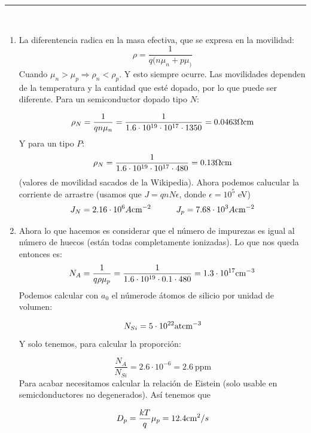 \rule{\textwidth}{0.1pt} \\[2pt]

\begin{enumerate}[label=\alph*)]
	\item La diferentencia radica en la masa efectiva, que se expresa en la movilidad:
		  \begin{equation}
			  \rho = \frac{1}{q(n\mu_n + p \mu_)}
		  \end{equation}
		  Cuando $\mu_n>\mu_p \Rightarrow \rho_n < \rho_p$. Y esto siempre ocurre. Las movilidades dependen de la temperatura y la cantidad que esté dopado, por lo que puede ser diferente. Para un semiconductor dopado tipo $N$:

		  \begin{equation}
			  \rho_N = \frac{1}{qn{\mu_n}} = \frac{1}{1.6\cdot 10^{19} \cdot 10^{17}\cdot 1350}= 0.0463 \Omega \text{cm}
		  \end{equation}
		  Y para un tipo $P$:
		  \begin{equation}
			  \rho_N = \frac{1}{1.6\cdot 10^{19} \cdot 10^{17}\cdot 480} = 0.13 \Omega \text{cm}
		  \end{equation}
		  (valores de movilidad sacados de la Wikipedia). Ahora podemos calucular la corriente de arrastre (usamos que $J=qnN\epsilon$, donde $\epsilon = 10^5$ eV)
		  \begin{equation}
			  J_N =  2.16 \cdot 10^6  A\text{cm}^{-2}  \quad \quad \quad J_p = 7.68 \cdot 10^3  A\text{cm}^{-2}
		  \end{equation}
	\item Ahora lo que hacemos es considerar que el número de impurezas es igual al número de huecos (están todas completamente ionizadas). Lo que nos queda entonces es:
		  \begin{equation}
			  N_A = \frac{1}{q\rho \mu_p } = \frac{1}{1.6\cdot 10^{19} \cdot 0.1 \cdot 480} = 1.3 \cdot 10^{17} \text{cm}^{-3}
		  \end{equation}
		  Podemos calcular con $a_0$ el númerode átomos de silicio por unidad de volumen:

		  \begin{equation}
			  N_{Si} = 5 \cdot 10^{22} \text{at} \text{cm}^{-3}
		  \end{equation}
		  Y solo tenemos, para calcular la proporción:

		  \begin{equation}
			  \frac{N_A}{N_{Si}} = 2.6 \cdot 10^{-6} = 2.6 \ \text{ppm}
		  \end{equation}
		  Para acabar necesitamos calcular la relación de Eistein (solo usable en semicdonductores no degenerados). Así tenemos que

		  \begin{equation}
			  D_p = \frac{kT}{q} \mu_p = 12.4 \text{cm}^2 / s
		  \end{equation}
\end{enumerate}

